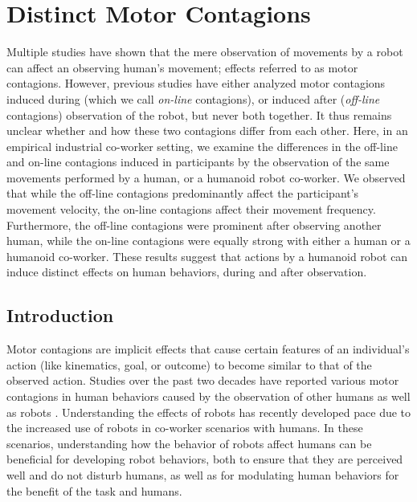 \documentclass[a4paper, 12pt, oneside]{Thesis}  %
\begin{document}
\chapter{Distinct Motor Contagions}

Multiple studies have shown that the mere observation of movements by a robot can affect an observing human's movement; effects referred to as motor contagions. However, previous studies have either analyzed motor contagions induced during (which we call \emph{on-line} contagions), or induced after (\emph{off-line} contagions) observation of the robot, but never both together. It thus remains unclear whether and how these two contagions differ from each other. Here, in an empirical industrial co-worker setting, we examine the differences in the off-line and on-line contagions induced in participants by the observation of the same movements performed by a human, or a humanoid robot co-worker. We observed that while the off-line contagions predominantly affect the participant's movement velocity, the on-line contagions affect their movement frequency. Furthermore, the off-line contagions were prominent after observing another human, while the on-line contagions were equally strong with either a human or a humanoid co-worker. These results suggest that actions by a humanoid robot can induce distinct effects on human behaviors, during and after observation.  	

\clearpage
\section{Introduction}

Motor contagions are implicit effects that cause certain features of an individual's action (like kinematics, goal, or outcome) to become similar to that of the observed action. Studies over the past two decades have reported various motor contagions in human behaviors caused by the observation of other humans as well as robots \cite{Blakemore:Neuropsychologia:2005, Fadiga:JNeuroPhys:1995, Ganesh:Springer:2015, Sciutti:IJSR:2012, Prinz:EJPAP:1997}. Understanding the effects of robots has recently developed pace due to the increased use of robots in co-worker scenarios with humans. In these scenarios, understanding how the behavior of robots affect humans can be beneficial for developing robot behaviors, both to ensure that they are perceived well and do not disturb humans, as well as for modulating human behaviors for the benefit of the task and humans.  
\end{document}
